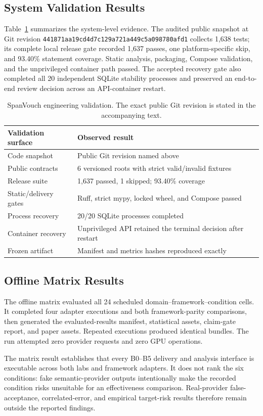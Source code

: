 \subsection{System Validation Results}

Table~\ref{tab:system-results} summarizes the system-level evidence. The audited
public snapshot at Git revision
\nolinkurl{441871aa19cd4d7c129a721a449c5a098780afd1} collects 1,638 tests;
its complete local release gate recorded 1,637 passes, one platform-specific
skip, and 93.40\% statement coverage.
Static analysis, packaging, Compose validation, and the unprivileged container
path passed. The accepted recovery gate also completed all 20 independent
SQLite stability processes and preserved an end-to-end review decision across
an API-container restart.

\begin{table}[t]
    \caption{SpanVouch engineering validation. The exact public Git revision
    is stated in the accompanying text.}
    \label{tab:system-results}
    \centering
    \small
    \begin{tabular}{@{}p{}p{}@{}}
        \toprule
        Validation surface & Observed result \\
        \midrule
        Code snapshot & Public Git revision named above \\
        Public contracts & 6 versioned roots with strict valid/invalid fixtures \\
        Release suite & 1,637 passed, 1 skipped; 93.40\% coverage \\
        Static/delivery gates & Ruff, strict mypy, locked wheel, and Compose passed \\
        Process recovery & 20/20 SQLite processes completed \\
        Container recovery & Unprivileged API retained the terminal decision after restart \\
        Frozen artifact & Manifest and metrics hashes reproduced exactly \\
        \bottomrule
    \end{tabular}
\end{table}

\subsection{Offline Matrix Results}

The offline matrix evaluated all 24 scheduled domain--framework--condition
cells. It completed four adapter executions and both framework-parity
comparisons, then generated the evaluated-results manifest, statistical assets,
claim-gate report, and paper assets. Repeated executions produced identical
bundles. The run attempted zero provider requests and zero GPU operations.

The matrix result establishes that every B0--B5 delivery and analysis interface
is executable across both labs and framework adapters. It does not rank the six
conditions: fake semantic-provider outputs intentionally make the recorded
condition risks unsuitable for an effectiveness comparison. Real-provider
false-acceptance, correlated-error, and empirical target-risk results therefore
remain outside the reported findings.
